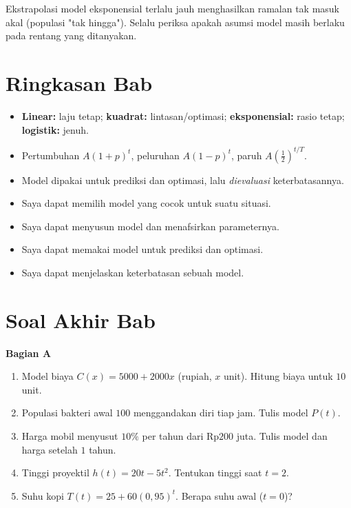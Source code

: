 \documentclass[11pt,a4paper]{report}
\theoremstyle{gaya}
\newcommand{\bagiansoal}[2]{%
  \par\medskip\noindent
  {\large\bfseries\color{biru}Bagian #1}\par\smallskip
  \addcontentsline{toc}{subsection}{Bagian #1}}
\newcommand{\cek}{\ding{113}\ } %
\begin{document}
\begin{kesalahan}
Ekstrapolasi model eksponensial terlalu jauh menghasilkan ramalan tak masuk akal (populasi "tak hingga"). Selalu periksa apakah asumsi model masih berlaku pada rentang yang ditanyakan.
\end{kesalahan}

\section*{Ringkasan Bab}
\begin{itemize}[leftmargin=*,topsep=2pt]
  \item \textbf{Linear:} laju tetap; \textbf{kuadrat:} lintasan/optimasi; \textbf{eksponensial:} rasio tetap; \textbf{logistik:} jenuh.
  \item Pertumbuhan $A(1+p)^t$, peluruhan $A(1-p)^t$, paruh $A(\tfrac12)^{t/T}$.
  \item Model dipakai untuk prediksi dan optimasi, lalu \emph{dievaluasi} keterbatasannya.
\end{itemize}

\begin{refleksi}
\begin{itemize}[leftmargin=*,topsep=2pt]
  \item[\cek] Saya dapat memilih model yang cocok untuk suatu situasi.
  \item[\cek] Saya dapat menyusun model dan menafsirkan parameternya.
  \item[\cek] Saya dapat memakai model untuk prediksi dan optimasi.
  \item[\cek] Saya dapat menjelaskan keterbatasan sebuah model.
\end{itemize}
\end{refleksi}

\section*{Soal Akhir Bab \thechapter}

\bagiansoal{A}{(Fundamental --- setara SNBT Dasar)}
\begin{enumerate}[leftmargin=*]
  \item Model biaya $C(x)=5000+2000x$ (rupiah, $x$ unit). Hitung biaya untuk $10$ unit.
  \item Populasi bakteri awal $100$ menggandakan diri tiap jam. Tulis model $P(t)$.
  \item Harga mobil menyusut $10\%$ per tahun dari Rp$200$ juta. Tulis model dan harga setelah $1$ tahun.
  \item Tinggi proyektil $h(t)=20t-5t^2$. Tentukan tinggi saat $t=2$.
  \item Suhu kopi $T(t)=25+60(0{,}95)^t$. Berapa suhu awal ($t=0$)?
\end{enumerate}
\end{document}
